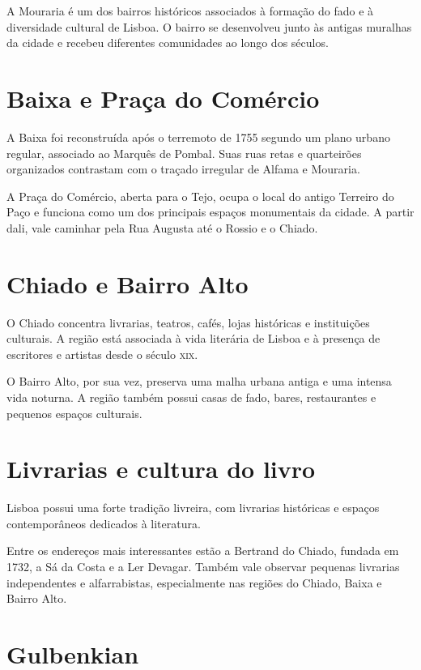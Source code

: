 A Mouraria é um dos bairros históricos associados à formação do fado e à diversidade cultural de Lisboa. O bairro se desenvolveu junto às antigas muralhas da cidade e recebeu diferentes comunidades ao longo dos séculos.

\chapter{Baixa e Praça do Comércio}

A Baixa foi reconstruída após o terremoto de 1755 segundo um plano urbano regular, associado ao Marquês de Pombal. Suas ruas retas e quarteirões organizados contrastam com o traçado irregular de Alfama e Mouraria.

A Praça do Comércio, aberta para o Tejo, ocupa o local do antigo Terreiro do Paço e funciona como um dos principais espaços monumentais da cidade. A partir dali, vale caminhar pela Rua Augusta até o Rossio e o Chiado.

\chapter{Chiado e Bairro Alto}

O Chiado concentra livrarias, teatros, cafés, lojas históricas e instituições culturais. A região está associada à vida literária de Lisboa e à presença de escritores e artistas desde o século \textsc{xix}.

O Bairro Alto, por sua vez, preserva uma malha urbana antiga e uma intensa vida noturna. A região também possui casas de fado, bares, restaurantes e pequenos espaços culturais.

\chapter{Livrarias e cultura do livro}

Lisboa possui uma forte tradição livreira, com livrarias históricas e espaços contemporâneos dedicados à literatura.

Entre os endereços mais interessantes estão a Bertrand do Chiado, fundada em 1732, a Sá da Costa e a Ler Devagar. Também vale observar pequenas livrarias independentes e alfarrabistas, especialmente nas regiões do Chiado, Baixa e Bairro Alto.

\chapter{Gulbenkian}

